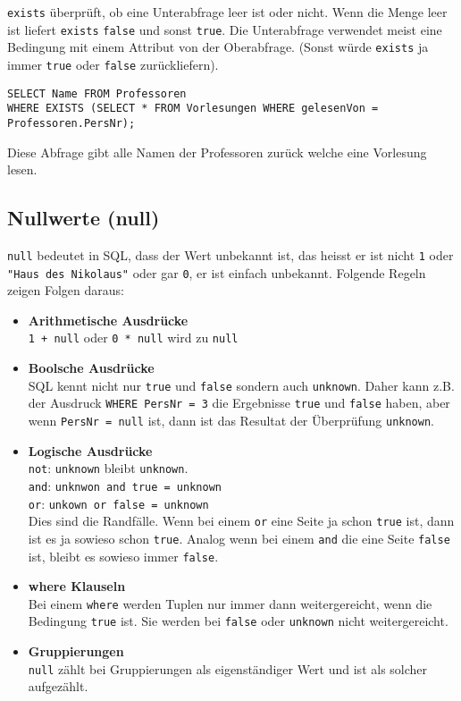 \texttt{exists} überprüft, ob eine Unterabfrage leer ist oder nicht. Wenn die Menge leer ist liefert \texttt{exists} \texttt{false} und sonst \texttt{true}. Die Unterabfrage verwendet meist eine Bedingung mit einem Attribut von der Oberabfrage. (Sonst würde \texttt{exists} ja immer \texttt{true} oder \texttt{false} zurückliefern).

\begin{lstlisting}[caption={SQL Beispiel mit Exists},label=lst:bsp_exists]
SELECT Name FROM Professoren
WHERE EXISTS (SELECT * FROM Vorlesungen WHERE gelesenVon = Professoren.PersNr);
\end{lstlisting}

Diese Abfrage gibt alle Namen der Professoren zurück welche eine Vorlesung lesen.

\subsection{Nullwerte (null)}

\texttt{null} bedeutet in SQL, dass der Wert unbekannt ist, das heisst er ist nicht \texttt{1} oder \texttt{"Haus des Nikolaus"} oder gar \texttt{0}, er ist einfach unbekannt. Folgende Regeln zeigen Folgen daraus:

\begin{itemize}
  \item \textbf{Arithmetische Ausdrücke} \\
  \texttt{1 + null} oder \texttt{0 * null} wird zu \texttt{null}
  \item \textbf{Boolsche Ausdrücke} \\
  SQL kennt nicht nur \texttt{true} und \texttt{false} sondern auch \texttt{unknown}. Daher kann z.B. der Ausdruck \texttt{WHERE PersNr = 3} die Ergebnisse \texttt{true} und \texttt{false} haben, aber wenn \texttt{PersNr = null} ist, dann ist das Resultat der Überprüfung \texttt{unknown}.
  \item \textbf{Logische Ausdrücke} \\
  \texttt{not}: \texttt{unknown} bleibt \texttt{unknown}. \\
  \texttt{and}: \texttt{unknwon and true = unknown} \\
  \texttt{or}: \texttt{unkown or false = unknown} \\
  Dies sind die Randfälle. Wenn bei einem \texttt{or} eine Seite ja schon \texttt{true} ist, dann ist es ja sowieso schon \texttt{true}. Analog wenn bei einem \texttt{and} die eine Seite \texttt{false} ist, bleibt es sowieso immer \texttt{false}.
  \item \textbf{where Klauseln} \\
  Bei einem \texttt{where} werden Tuplen nur immer dann weitergereicht, wenn die Bedingung \texttt{true} ist. Sie werden bei \texttt{false} oder \texttt{unknown} nicht weitergereicht.
  \item \textbf{Gruppierungen} \\
  \texttt{null} zählt bei Gruppierungen als eigenständiger Wert und ist als solcher aufgezählt.
\end{itemize}

